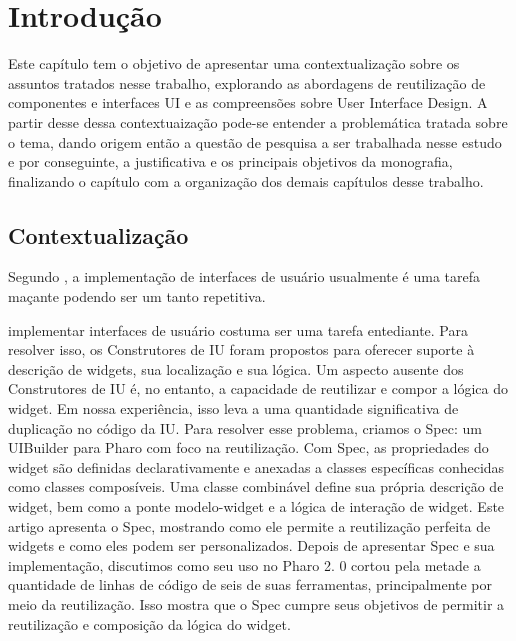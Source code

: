 \chapter{Introdução}

Este capítulo tem o objetivo de apresentar uma contextualização sobre os assuntos tratados nesse trabalho, explorando as abordagens de reutilização de componentes e interfaces UI e as compreensões sobre User Interface Design. A partir desse dessa contextuaização pode-se entender a problemática tratada sobre o tema, dando origem então a questão de pesquisa a ser trabalhada nesse estudo e por conseguinte, a justificativa e os principais objetivos da monografia, finalizando o capítulo com a organização dos demais capítulos desse trabalho.

\section{Contextualização}
Segundo \cite{10.1145/2448963.2448965}, a implementação de interfaces de usuário usualmente é uma tarefa maçante podendo ser um tanto repetitiva. 

implementar interfaces de usuário costuma ser uma tarefa entediante. Para resolver isso, os Construtores de IU foram propostos para oferecer suporte à descrição de widgets, sua localização e sua lógica. Um aspecto ausente dos Construtores de IU é, no entanto, a capacidade de reutilizar e compor a lógica do widget. Em nossa experiência, isso leva a uma quantidade significativa de duplicação no código da IU. Para resolver esse problema, criamos o Spec: um UIBuilder para Pharo com foco na reutilização. Com Spec, as propriedades do widget são definidas declarativamente e anexadas a classes específicas conhecidas como classes composíveis. Uma classe combinável define sua própria descrição de widget, bem como a ponte modelo-widget e a lógica de interação de widget. Este artigo apresenta o Spec, mostrando como ele permite a reutilização perfeita de widgets e como eles podem ser personalizados. Depois de apresentar Spec e sua implementação, discutimos como seu uso no Pharo 2. 0 cortou pela metade a quantidade de linhas de código de seis de suas ferramentas, principalmente por meio da reutilização. Isso mostra que o Spec cumpre seus objetivos de permitir a reutilização e composição da lógica do widget.